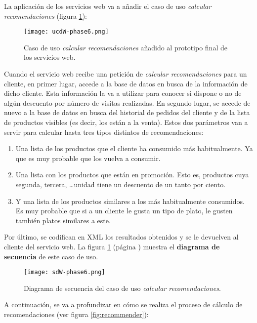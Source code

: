 La aplicación de los servicios web va a añadir el caso de uso \emph{calcular 
recomendaciones} (figura \ref{fig:ucdW-phase6}):

  \begin{figure}[H]
    \begin{center}
      \texttt{[image: ucdW-phase6.png]}
      \caption{Caso de uso \emph{calcular recomendaciones} añadido al prototipo
      final de los servicios web.}
      \label{fig:ucdW-phase6}
    \end{center}
  \end{figure}

Cuando el servicio web recibe una petición de \emph{calcular recomendaciones} 
para un cliente, en primer lugar, accede a la base de datos en busca de la
información de dicho cliente. Esta información la va a utilizar para conocer
si dispone o no de algún descuento por número de visitas realizadas. En
segundo lugar, se accede de nuevo a la base de datos en busca del historial
de pedidos del cliente y de la lista de productos visibles (es decir, los están
a la venta). Estos dos parámetros van a servir para calcular hasta tres tipos
distintos de recomendaciones:
\begin{enumerate}
\item Una lista de los productos que el cliente ha consumido más habitualmente. 
Ya que es muy probable que los vuelva a consumir.
\item Una lista con los productos que están en promoción. Esto es, productos 
cuya segunda, tercera, \dots unidad tiene un descuento de un tanto por ciento.
\item Y una lista de los productos similares a los más habitualmente 
consumidos. Es muy probable que si a un cliente le gusta un tipo de plato, le 
gusten también platos similares a este.
\end{enumerate}
Por último, se codifican en \acs{XML} los resultados obtenidos y se le
devuelven al cliente del servicio web. La figura \ref{fig:ucdW-phase6}
(página \pageref{fig:ucdW-phase6}) muestra el \textbf{diagrama de secuencia}
de este caso de uso.

  \begin{sidewaysfigure}[hp]
    \begin{center}
      \texttt{[image: sdW-phase6.png]}
      \caption{Diagrama de secuencia del caso de uso \emph{calcular 
      recomendaciones}.}
      \label{fig:sdW-phase6}
    \end{center}
  \end{sidewaysfigure}
\newpage
A continuación, se va a profundizar en cómo se realiza el proceso de cálculo
de recomendaciones (ver figura \ref{fig:recommender}):

